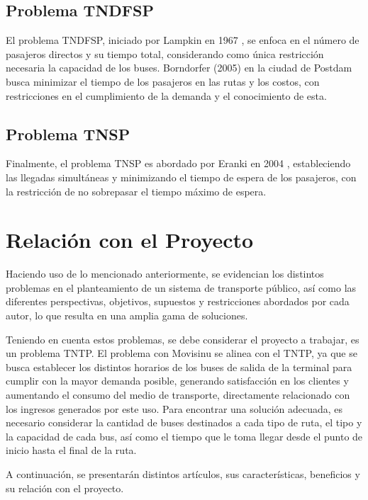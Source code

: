 \documentclass[preprint,11pt]{elsarticle}
\begin{document}
\subsection{Problema TNDFSP}

El problema TNDFSP, iniciado por Lampkin en 1967 \cite{lampkin1967}, se enfoca en el número de pasajeros directos y su tiempo total, considerando como única restricción necesaria la capacidad de los buses. Borndorfer (2005) \cite{borndorfer2005} en la ciudad de Postdam busca minimizar el tiempo de los pasajeros en las rutas y los costos, con restricciones en el cumplimiento de la demanda y el conocimiento de esta.

\subsection{Problema TNSP}

Finalmente, el problema TNSP es abordado por Eranki en 2004 \cite{eranki2004}, estableciendo las llegadas simultáneas y minimizando el tiempo de espera de los pasajeros, con la restricción de no sobrepasar el tiempo máximo de espera.

\section{Relación con el Proyecto}

Haciendo uso de lo mencionado anteriormente, se evidencian los distintos problemas en el planteamiento de un sistema de transporte público, así como las diferentes perspectivas, objetivos, supuestos y restricciones abordados por cada autor, lo que resulta en una amplia gama de soluciones.

Teniendo en cuenta estos problemas, se debe considerar el proyecto a trabajar, es un problema TNTP. El problema con Movisinu se alinea con el TNTP, ya que se busca establecer los distintos horarios de los buses de salida de la terminal para cumplir con la mayor demanda posible, generando satisfacción en los clientes y aumentando el consumo del medio de transporte, directamente relacionado con los ingresos generados por este uso. Para encontrar una solución adecuada, es necesario considerar la cantidad de buses destinados a cada tipo de ruta, el tipo y la capacidad de cada bus, así como el tiempo que le toma llegar desde el punto de inicio hasta el final de la ruta.

A continuación, se presentarán distintos artículos, sus características, beneficios y su relación con el proyecto.
\end{document}
